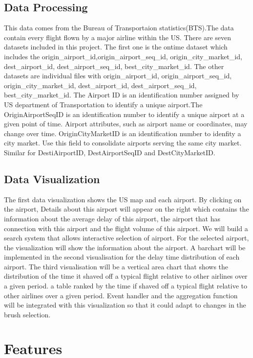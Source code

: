 \documentclass[11pt]{article}
\theoremstyle{definition}
\begin{document}
\subsection{\textbf{Data Processing}}
This data comes from the Bureau of Transportaion statistics(BTS).The data contain every flight flown by a major airline within the US. There are seven datasets included in this project. The first one is the ontime dataset which includes the origin\_airport\_id,origin\_airport\_seq\_id, origin\_city\_market\_id, dest\_airport\_id, dest\_airport\_seq\_id, best\_city\_market\_id. The other datasets are individual files with origin\_airport\_id, origin\_airport\_seq\_id, origin\_city\_market\_id, dest\_airport\_id, dest\_airport\_seq\_id, best\_city\_market\_id. The Airport ID is an identification number assigned by US department of Transportation to identify a unique airport.The OriginAirportSeqID is an identification number to identify a unique airport at a given point of time. Airport attributes, such as airport name or coordinates, may change over time. OriginCityMarketID is an identification number to idenfity a city market. Use this field to consolidate airports serving the same city market.
Similar for DestiAirportID, DestAirportSeqID and DestCityMarketID.
\subsection{\textbf{Data Visualization}}
The first data visualization shows the US map and each airport. By clicking on the airport, Details about this airport will appear on the right which contains the information about the average delay of this airport, the airport that has connection with this airport and the flight volume of this airport. We will build a search system that allows interactive selection of airport. For the selected airport, the visualization will show the information about the airport. A barchart will be implemented in the second visualisation for the delay time distribution of each airport.
The third visualisation will be a vertical area chart that shows the distribution of the time it shaved off a typical flight relative to other airlines over a given period.
a table ranked by the time if shaved off a typical flight relative to other airlines over a given period. Event handler and the aggregation function will be integrated with this visualization so that it could adapt to changes in the brush selection. 



\section{\textbf{Features}}
\end{document}
